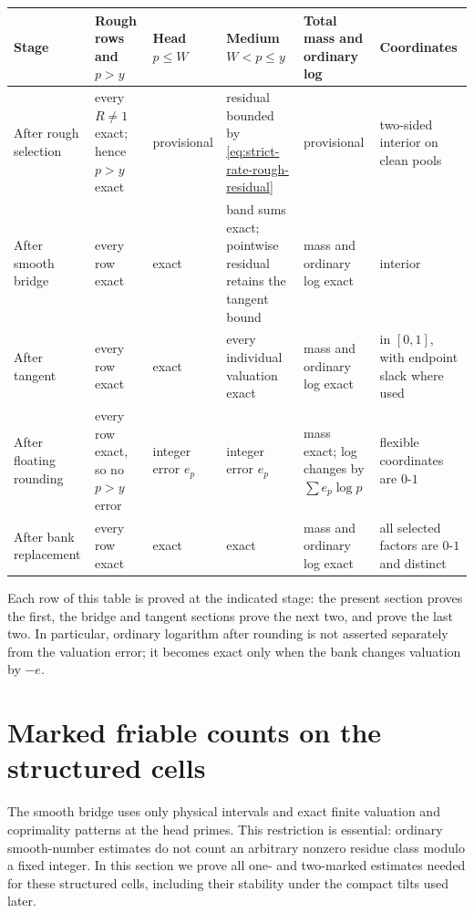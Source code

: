 \documentclass[11pt]{article}
\numberwithin{equation}{section}
\theoremstyle{definition}
\theoremstyle{remark}
\newcommand{\1}{\mathbf 1}
\begin{document}
\begin{center}
\small
\begin{tabular}{@{}>{\raggedright\arraybackslash}p{1.55cm}
 >{\raggedright\arraybackslash}p{2.45cm}
 >{\raggedright\arraybackslash}p{2.25cm}
 >{\raggedright\arraybackslash}p{2.55cm}
 >{\raggedright\arraybackslash}p{2.7cm}
 >{\raggedright\arraybackslash}p{2.25cm}@{}}
\toprule
Stage & Rough rows and \(p>y\) & Head \(p\le W\) & Medium \(W<p\le y\) & Total mass and ordinary log & Coordinates \\
\midrule
After rough selection & every \(R\ne1\) exact; hence \(p>y\) exact & provisional & residual bounded by \eqref{eq:strict-rate-rough-residual} & provisional & two-sided interior on clean pools \\
After smooth bridge & every row exact & exact & band sums exact; pointwise residual retains the tangent bound & mass and ordinary log exact & interior \\
After tangent & every row exact & exact & every individual valuation exact & mass and ordinary log exact & in \([0,1]\), with endpoint slack where used \\
After floating rounding & every row exact, so no \(p>y\) error & integer error \(e_p\) & integer error \(e_p\) & mass exact; log changes by \(\sum e_p\log p\) & flexible coordinates are \(0\)-\(1\) \\
After bank replacement & every row exact & exact & exact & mass and ordinary log exact & all selected factors are \(0\)-\(1\) and distinct \\
\bottomrule
\end{tabular}
\end{center}

Each row of this table is proved at the indicated stage: the present
section proves the first, the bridge and tangent sections prove the next
two, and 
prove the last two.  In particular, ordinary logarithm after rounding is
not asserted separately from the valuation error; it becomes exact only
when the bank changes valuation by \(-e\).
 \section{Marked friable counts on the structured cells}
\label{sec:marked-smooth}

The smooth bridge uses only physical intervals and exact finite
valuation and coprimality patterns at the head primes.  This restriction is
essential: ordinary smooth-number estimates do not count an arbitrary
nonzero residue class modulo a fixed integer.  In this section we prove all
one- and two-marked estimates needed for these structured cells, including
their stability under the compact tilts used later.
\end{document}
